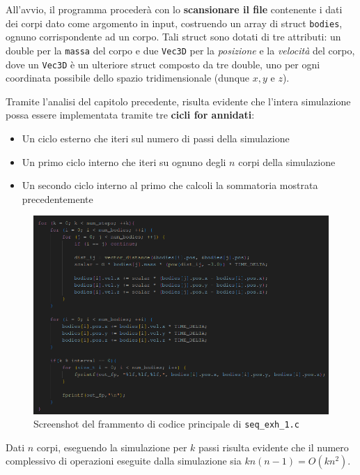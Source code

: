 \documentclass[12pt]{report}
\begin{document}
    All'avvio, il programma procederà con lo \textbf{scansionare il file} contenente i dati dei corpi dato come argomento in input, costruendo un array di struct \texttt{bodies}, ognuno corrispondente ad un corpo. Tali struct sono dotati di tre attributi: un double per la \texttt{massa} del corpo e due \texttt{Vec3D} per la \textit{posizione} e la \textit{velocità} del corpo, dove un \texttt{Vec3D} è un ulteriore struct composto da tre double, uno per ogni coordinata possibile dello spazio tridimensionale (dunque $x,y$ e $z$).

    Tramite l'analisi del capitolo precedente, risulta evidente che l'intera simulazione possa essere implementata tramite tre \textbf{cicli for annidati}:
    \begin{itemize}
        \item Un ciclo esterno che iteri sul numero di passi della simulazione
        \item Un primo ciclo interno che iteri su ognuno degli $n$ corpi della simulazione
        \item Un secondo ciclo interno al primo che calcoli la sommatoria mostrata precedentemente
    \end{itemize}

    \begin{figure}[h]
        \centering
        \includegraphics[width=\textwidth]{images/seq_exh_1.png}
        \caption{Screenshot del frammento di codice principale di \texttt{seq\_exh\_1.c}}
        \label{fig:seq_exh_1}
    \end{figure}

    \newpage

    Dati $n$ corpi, eseguendo la simulazione per $k$ passi risulta evidente che il numero complessivo di operazioni eseguite dalla simulazione sia $kn(n-1) = O(kn^2)$.
\end{document}
